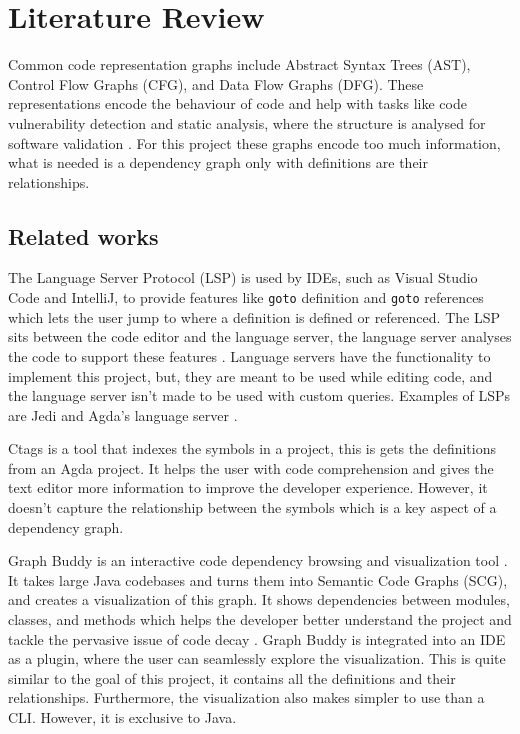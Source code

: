 
\chapter{Literature Review}


Common code representation graphs include Abstract Syntax Trees (AST), Control
Flow Graphs (CFG), and Data Flow Graphs (DFG). These representations encode the
behaviour of code and help with tasks like code vulnerability detection
\cite{graph_for_code_vuln} and static analysis, where the structure is analysed
for software validation \cite{static_analysis}. For this project these graphs
encode too much information, what is needed is a dependency graph only with
definitions are their relationships.


\section{Related works}

The Language Server Protocol (LSP) is used by IDEs, such as Visual Studio Code
and IntelliJ, to provide features like \texttt{goto} definition and
\texttt{goto} references which lets the user jump to where a definition is
defined or referenced. The LSP sits between the code editor and the language
server, the language server analyses the code to support these features
\cite{LSP_implementation}. Language servers have the functionality to implement
this project, but, they are meant to be used while editing code, and the
language server isn't made to be used with custom queries. Examples of LSPs are
Jedi \cite{jedi_lsp} and Agda's language server \cite{agda_lsp}.

Ctags \cite{ctags} is a tool that indexes the symbols in a project, this is
gets the definitions from an Agda project. It helps the user with
code comprehension and gives the text editor more information to improve the
developer experience. However, it doesn't capture the relationship between the
symbols which is a key aspect of a dependency graph.

Graph Buddy is an interactive code dependency browsing and visualization tool
\cite{graph_buddy}. It takes large Java codebases and turns them into Semantic
Code Graphs (SCG), and creates a visualization of this graph. It shows
dependencies between modules, classes, and methods which helps the developer
better understand the project and tackle the pervasive issue of code decay
\cite{code_decay_evidence}. Graph Buddy is integrated into an IDE as a plugin,
where the user can seamlessly explore the visualization. This is quite similar
to the goal of this project, it contains all the definitions and their
relationships. Furthermore, the visualization also makes simpler to use
than a CLI. However, it is exclusive to Java.

